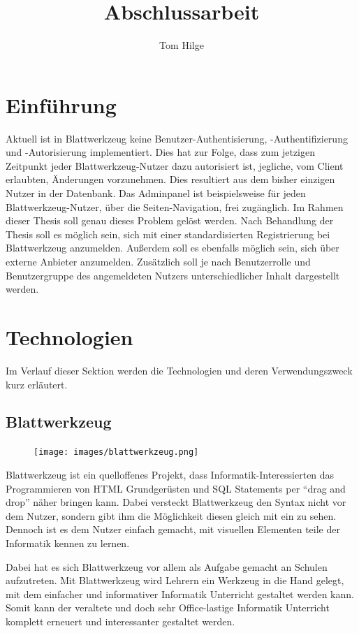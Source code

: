 \documentclass[11pt]{article}
\title{Abschlussarbeit}
\author{Tom Hilge}
\begin{document}
	
	\section{Einführung}
	\label{sec:introduction}
	Aktuell ist in Blattwerkzeug keine Benutzer-Authentisierung, -Authentifizierung und -Autorisierung implementiert. Dies hat zur Folge, dass  zum jetzigen Zeitpunkt jeder Blattwerkzeug-Nutzer dazu autorisiert ist, jegliche, vom Client erlaubten, Änderungen vorzunehmen. Dies resultiert aus dem bisher einzigen Nutzer in der Datenbank. Das Adminpanel ist beispielsweise für jeden Blattwerkzeug-Nutzer, über die Seiten-Navigation, frei zugänglich. Im Rahmen dieser Thesis soll genau dieses Problem gelöst werden. Nach Behandlung der Thesis soll es möglich sein, sich mit einer standardisierten Registrierung bei Blattwerkzeug anzumelden. Außerdem soll es ebenfalls möglich sein, sich über externe Anbieter anzumelden. Zusätzlich soll je nach Benutzerrolle und Benutzergruppe des angemeldeten Nutzers unterschiedlicher Inhalt dargestellt werden.
	
	\section{Technologien}
	\label{sec:technology}
	Im Verlauf dieser Sektion werden die Technologien und deren Verwendungszweck
	kurz erläutert.

	\subsection{Blattwerkzeug}
	\label{sec:blattwerkzeug}
	
	\begin{figure}
		\texttt{[image: images/blattwerkzeug.png]}
	\end{figure}
	
	
	Blattwerkzeug ist ein quelloffenes Projekt, dass Informatik-Interessierten das Programmieren von \gls{HTML} Grundgerüsten und SQL Statements per \enquote{drag and drop} näher bringen kann. Dabei versteckt Blattwerkzeug den Syntax nicht vor dem Nutzer, sondern gibt ihm die Möglichkeit diesen gleich mit ein zu sehen. Dennoch ist es dem Nutzer einfach gemacht, mit visuellen Elementen teile der Informatik kennen zu lernen.
	
	Dabei hat es sich Blattwerkzeug vor allem als Aufgabe gemacht an Schulen aufzutreten. Mit Blattwerkzeug wird Lehrern ein Werkzeug in die Hand gelegt, mit dem einfacher und informativer Informatik Unterricht gestaltet werden kann. Somit kann der veraltete und doch sehr Office-lastige Informatik Unterricht komplett erneuert und interessanter gestaltet werden.
	
\end{document}
